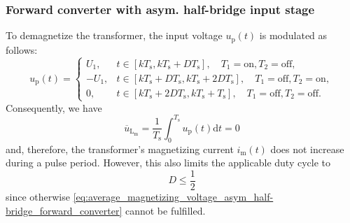 \begin{frame}
    \frametitle{Forward converter with asym. half-bridge input stage}
    To demagnetize the transformer, the input voltage $u_\mathrm{p}(t)$ is modulated as follows:
    \begin{equation}
        u_\mathrm{p}(t) = \begin{cases}
            U_1, &  t\in[kT_\mathrm{s}, kT_\mathrm{s}+D T_\mathrm{s}], \quad T_1=\mathrm{on}, T_2=\mathrm{off},\\
            -U_1, & t\in[kT_\mathrm{s}+D T_\mathrm{s}, kT_\mathrm{s}+2D T_\mathrm{s}], \quad  T_1=\mathrm{off}, T_2=\mathrm{on},\\
            0, &  t\in[kT_\mathrm{s}+2D T_\mathrm{s}, kT_\mathrm{s}+T_\mathrm{s}], \quad T_1=\mathrm{off}, T_2=\mathrm{off}.
        \end{cases}  
    \end{equation}
    Consequently, we have
    \begin{equation}
        \overline{u}_\mathrm{L_\mathrm{m}} = \frac{1}{T_\mathrm{s}}\int_{0}^{T_\mathrm{s}}u_\mathrm{p}(t)\mathrm{d}t = 0
    \label{eq:average_magnetizing_voltage_asym_half-bridge_forward_converter}
    \end{equation}
    and, therefore, the transformer's magnetizing current $i_\mathrm{m}(t)$ does not increase during a pulse period. However, this also limits the applicable duty cycle to 
    $$
    D\leq\frac{1}{2}
    $$
    since otherwise \eqref{eq:average_magnetizing_voltage_asym_half-bridge_forward_converter} cannot be fulfilled.
\end{frame}


